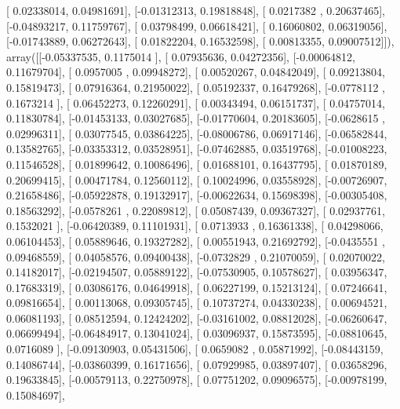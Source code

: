 \documentclass{article}
\begin{document}
       [ 0.02338014,  0.04981691],
       [-0.01312313,  0.19818848],
       [ 0.0217382 ,  0.20637465],
       [-0.04893217,  0.11759767],
       [ 0.03798499,  0.06618421],
       [ 0.16060802,  0.06319056],
       [-0.01743889,  0.06272643],
       [ 0.01822204,  0.16532598],
       [ 0.00813355,  0.09007512]]), array([[-0.05337535,  0.1175014 ],
       [ 0.07935636,  0.04272356],
       [-0.00064812,  0.11679704],
       [ 0.0957005 ,  0.09948272],
       [ 0.00520267,  0.04842049],
       [ 0.09213804,  0.15819473],
       [ 0.07916364,  0.21950022],
       [ 0.05192337,  0.16479268],
       [-0.0778112 ,  0.1673214 ],
       [ 0.06452273,  0.12260291],
       [ 0.00343494,  0.06151737],
       [ 0.04757014,  0.11830784],
       [-0.01453133,  0.03027685],
       [-0.01770604,  0.20183605],
       [-0.0628615 ,  0.02996311],
       [ 0.03077545,  0.03864225],
       [-0.08006786,  0.06917146],
       [-0.06582844,  0.13582765],
       [-0.03353312,  0.03528951],
       [-0.07462885,  0.03519768],
       [-0.01008223,  0.11546528],
       [ 0.01899642,  0.10086496],
       [ 0.01688101,  0.16437795],
       [ 0.01870189,  0.20699415],
       [ 0.00471784,  0.12560112],
       [ 0.10024996,  0.03558928],
       [-0.00726907,  0.21658486],
       [-0.05922878,  0.19132917],
       [-0.00622634,  0.15698398],
       [-0.00305408,  0.18563292],
       [-0.0578261 ,  0.22089812],
       [ 0.05087439,  0.09367327],
       [ 0.02937761,  0.1532021 ],
       [-0.06420389,  0.11101931],
       [ 0.0713933 ,  0.16361338],
       [ 0.04298066,  0.06104453],
       [ 0.05889646,  0.19327282],
       [ 0.00551943,  0.21692792],
       [-0.0435551 ,  0.09468559],
       [ 0.04058576,  0.09400438],
       [-0.0732829 ,  0.21070059],
       [ 0.02070022,  0.14182017],
       [-0.02194507,  0.05889122],
       [-0.07530905,  0.10578627],
       [ 0.03956347,  0.17683319],
       [ 0.03086176,  0.04649918],
       [ 0.06227199,  0.15213124],
       [ 0.07246641,  0.09816654],
       [ 0.00113068,  0.09305745],
       [ 0.10737274,  0.04330238],
       [ 0.00694521,  0.06081193],
       [ 0.08512594,  0.12424202],
       [-0.03161002,  0.08812028],
       [-0.06260647,  0.06699494],
       [-0.06484917,  0.13041024],
       [ 0.03096937,  0.15873595],
       [-0.08810645,  0.0716089 ],
       [-0.09130903,  0.05431506],
       [ 0.0659082 ,  0.05871992],
       [-0.08443159,  0.14086744],
       [-0.03860399,  0.16171656],
       [ 0.07929985,  0.03897407],
       [ 0.03658296,  0.19633845],
       [-0.00579113,  0.22750978],
       [ 0.07751202,  0.09096575],
       [-0.00978199,  0.15084697],
\end{document}
